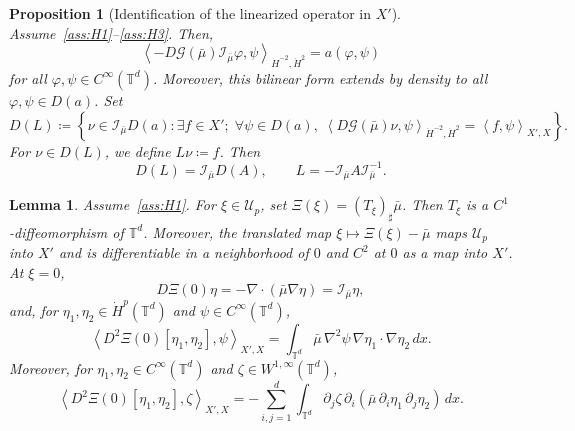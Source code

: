 \documentclass[10pt,a4paper]{amsart}
\newtheorem{lemma}{Lemma}
\newtheorem{proposition}{Proposition}
\newcommand{\T}{\mathbb{T}}
\newcommand{\dotHk}[1][k]{\dot{H}^{#1}}
\newcommand{\rieszmap}[1][\mu]{\mathcal{I}_{#1}}
\begin{document}
\begin{proposition}[Identification of the linearized operator in $X'$]
    \label{prop:linearized_operator_identification}
    Assume~\ref{ass:H1}--\ref{ass:H3}. 
    Then,
    \[
    \left\langle -D\mathcal{G}(\bar\mu)\rieszmap[\bar\mu]\varphi,\psi\right\rangle_{\dot{H}^{-2}, \dotHk[2]} = a(\varphi, \psi)
    \]
    for all $\varphi, \psi\in C^\infty(\T^d)$.
    Moreover, this bilinear form extends by density to all $\varphi, \psi \in D(a)$.
    Set
    \[
    D(L) \coloneqq \left\{\nu \in \rieszmap[\bar\mu]D(a) : \exists f \in X'; \; \forall \psi \in D(a), \; \left\langle D\mathcal{G}(\bar\mu)\nu, \psi\right\rangle_{\dot{H}^{-2}, \dotHk[2]} = \left\langle f,\psi\right\rangle_{X',X} \right\}.
    \]
    For $\nu \in D(L)$, we define $L\nu \coloneqq f$.
    Then
    \[
    D(L) = \rieszmap[\bar\mu]D(A), \qquad L = -\rieszmap[\bar\mu]A\rieszmap[\bar\mu]^{-1}.
    \]
\end{proposition}

\begin{lemma}
    \label{lem:pushforward_map}
    Assume~\ref{ass:H1}.
    For $\xi \in \mathcal{U}_p$, set $\Xi(\xi) = (T_\xi)_{\sharp}\bar\mu$.
    Then $T_\xi$ is a $C^1$-diffeomorphism of $\T^d$.
    Moreover, the translated map $\xi \mapsto \Xi(\xi)-\bar\mu$ maps $\mathcal{U}_p$ into $X'$ and is differentiable in a neighborhood of $0$ and $C^2$ at $0$ as a map into $X'$.
    At $\xi = 0$,
    \[
    D\Xi(0)\eta = -\nabla \cdot (\bar\mu \nabla\eta) = \rieszmap[\bar\mu]\eta,
    \]
    and, for $\eta_1, \eta_2 \in \dotHk[p](\T^d)$ and $\psi \in C^{\infty}(\T^d)$,
    \[
    \left\langle D^2\Xi(0)[\eta_1,\eta_2],\psi\right\rangle_{X',X} = \int_{\T^d}\bar\mu\,\nabla^2\psi\,\nabla\eta_1\cdot\nabla\eta_2\,dx.
    \]
    Moreover, for $\eta_1, \eta_2 \in C^\infty(\T^d)$ and $\zeta \in W^{1,\infty}(\T^d)$,
    \[
    \left\langle D^2\Xi(0)[\eta_1,\eta_2],\zeta\right\rangle_{X',X} = -\sum_{i,j=1}^d\int_{\T^d}\partial_j\zeta\,\partial_i(\bar\mu \,\partial_i\eta_1\,\partial_j\eta_2) \, dx.
    \]
\end{lemma}
\end{document}
